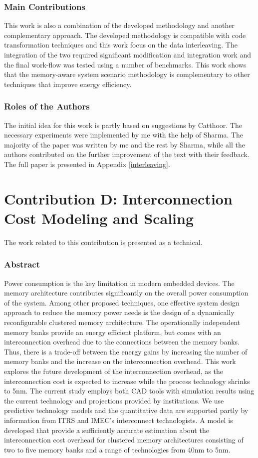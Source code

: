 \subsubsection{Main Contributions}

This work is also a combination of the developed methodology and another complementary approach.
The developed methodology is compatible with code transformation techniques and this work focus on the data interleaving.
The integration of the two required significant modification and integration work and the final work-flow was tested using a number of benchmarks.
This work shows that the memory-aware system scenario methodology is complementary to other techniques that improve energy efficiency.

\subsubsection{Roles of the Authors}

The initial idea for this work is partly based on suggestions by Catthoor. 
The necessary experiments were implemented by me with the help of Sharma.
The majority of the paper was written by me and the rest by Sharma, while all the authors contributed on the further improvement of the text with their feedback.
The full paper is presented in Appendix \ref{interleaving}.

\section{Contribution D: Interconnection Cost Modeling and Scaling}

The work related to this contribution is presented as a technical.

\subsubsection{Abstract}
Power consumption is the key limitation in modern embedded devices.
The memory architecture contributes significantly on the overall power consumption of the system.
Among other proposed techniques, one effective system design approach to reduce the memory power needs is the design of a dynamically reconfigurable clustered memory architecture.
The operationally independent memory banks provide an energy efficient platform, but comes with an interconnection overhead due to the connections between the memory banks. 
Thus, there is a trade-off between the energy gains by increasing the number of memory banks and the increase on the interconnection overhead.
This work explores the future development of the interconnection overhead, as the interconnection cost is expected to increase while the process technology shrinks to 5nm.
The current study employs both CAD tools with simulation results using the current technology and projections provided by institutions.
We use predictive technology models and the quantitative data are supported partly by information
from ITRS and IMEC's interconnect technologists.
A model is developed that provide a sufficiently accurate estimation about the interconnection cost overhead for clustered memory architectures consisting of two to five memory banks and a range of technologies from 40nm to 5nm.  

